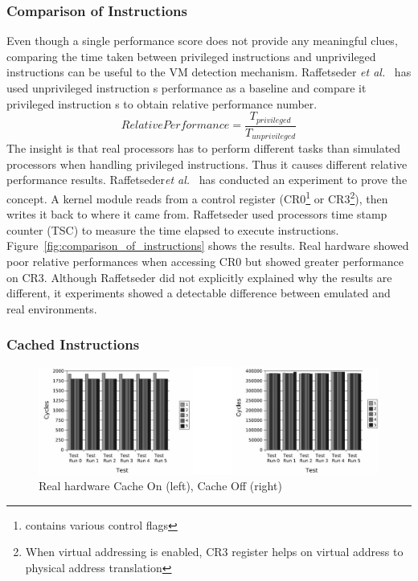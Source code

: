 \subsubsection{Comparison of Instructions}
Even though a single performance score does not provide any meaningful clues, comparing the time taken between privileged instructions and unprivileged instructions can be useful to the VM detection mechanism. Raffetseder {\em et al.}~\cite{raffetseder2007} has used unprivileged instruction \textquotesingle s performance as a baseline and compare it privileged instruction \textquotesingle s to obtain relative performance number.
\begin{equation*}
Relative Performance = \frac{T_{privileged}}{T_{unprivileged}}
\end{equation*}
The insight is that real processors has to perform different tasks than simulated processors when handling privileged instructions. Thus it causes different relative performance results.  Raffetseder{\em et al.}~\cite{raffetseder2007} has conducted an experiment to prove the concept. A kernel module reads from a control register (CR0\footnote{contains various control flags} or CR3\footnote{When virtual addressing is enabled, CR3 register helps on virtual address to physical address translation}), then writes it back to where it came from. Raffetseder used processor\textquotesingle s time stamp counter (TSC) to measure the time elapsed to execute instructions. Figure~\ref{fig:comparison_of_instructions} shows the results. Real hardware showed poor relative performances when accessing CR0 but showed greater performance on CR3. Although Raffetseder did not explicitly explained why the results are different, it experiments showed a detectable difference between emulated and real environments.

\subsubsection{Cached Instructions}

\begin{figure}[!t]
	\centering
	\includegraphics[width=\textwidth]{figure/realhw.jpg}
	\caption{Real hardware Cache On (left), Cache Off (right)}
	\label{fig:cache_realhw}
\end{figure}

